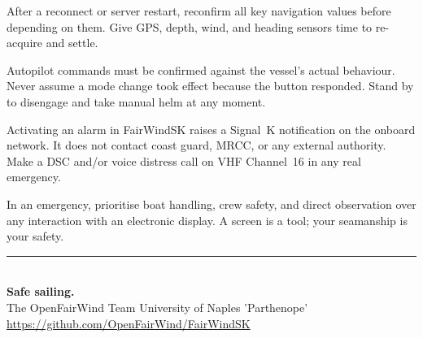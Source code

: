 \begin{warningbox}
After a reconnect or server restart, reconfirm all key navigation values before
depending on them.
Give GPS, depth, wind, and heading sensors time to re-acquire and settle.
\end{warningbox}

\begin{warningbox}
Autopilot commands must be confirmed against the vessel's actual behaviour.
Never assume a mode change took effect because the button responded.
Stand by to disengage and take manual helm at any moment.
\end{warningbox}

\begin{warningbox}
Activating an alarm in FairWindSK raises a Signal~K notification on the onboard
network.
It does not contact coast guard, MRCC, or any external authority.
Make a DSC and/or voice distress call on VHF Channel~16 in any real emergency.
\end{warningbox}

\begin{warningbox}
In an emergency, prioritise boat handling, crew safety, and direct observation over
any interaction with an electronic display.
A screen is a tool; your seamanship is your safety.
\end{warningbox}

\vfill
\begin{center}
  {\color{Teal}\rule{0.5\textwidth}{1pt}}\\[10pt]
  {\Large\sffamily\bfseries\color{Navy}Safe sailing.}\\[8pt]
  {\normalsize\sffamily\color{gray}
    The OpenFairWind Team \textbullet{}
    University of Naples 'Parthenope'}\\[4pt]
  {\small\sffamily\color{Teal}\url{https://github.com/OpenFairWind/FairWindSK}}
\end{center}
